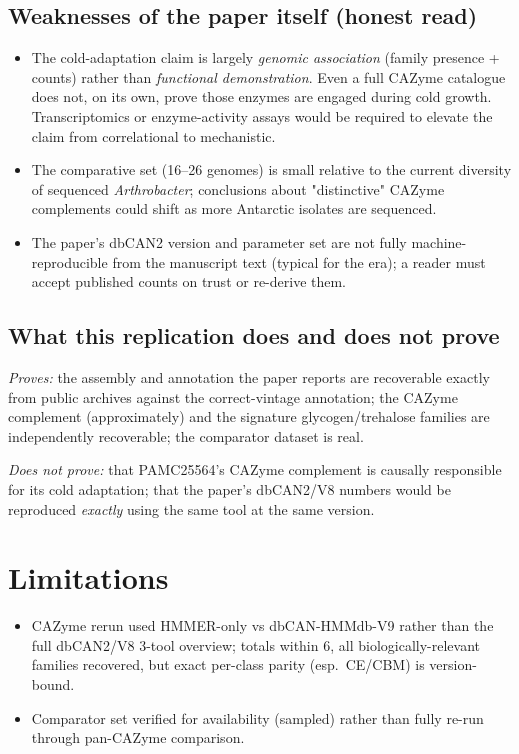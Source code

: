\documentclass[11pt]{article}
\begin{document}
\subsection{Weaknesses of the paper itself (honest read)}
\begin{itemize}
  \item The cold-adaptation claim is largely \emph{genomic association} (family presence + counts) rather than \emph{functional demonstration}. Even a full CAZyme catalogue does not, on its own, prove those enzymes are engaged during cold growth. Transcriptomics or enzyme-activity assays would be required to elevate the claim from correlational to mechanistic.
  \item The comparative set (16--26 genomes) is small relative to the current diversity of sequenced \emph{Arthrobacter}; conclusions about "distinctive" CAZyme complements could shift as more Antarctic isolates are sequenced.
  \item The paper's dbCAN2 version and parameter set are not fully machine-reproducible from the manuscript text (typical for the era); a reader must accept published counts on trust or re-derive them.
\end{itemize}

\subsection{What this replication does and does not prove}
\emph{Proves:} the assembly and annotation the paper reports are recoverable exactly from public archives against the correct-vintage annotation; the CAZyme complement (approximately) and the signature glycogen/trehalose families are independently recoverable; the comparator dataset is real.

\emph{Does not prove:} that PAMC25564's CAZyme complement is causally responsible for its cold adaptation; that the paper's dbCAN2/V8 numbers would be reproduced \emph{exactly} using the same tool at the same version.

\section{Limitations}
\begin{itemize}
  \item CAZyme rerun used HMMER-only vs dbCAN-HMMdb-V9 rather than the full dbCAN2/V8 3-tool overview; totals within 6, all biologically-relevant families recovered, but exact per-class parity (esp.\ CE/CBM) is version-bound.
  \item Comparator set verified for availability (sampled) rather than fully re-run through pan-CAZyme comparison.
\end{itemize}
\end{document}
